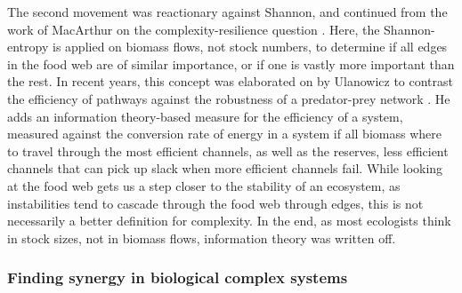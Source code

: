 \documentclass[../main.tex]{subfiles}
\begin{document}
The second movement was reactionary against Shannon, and continued from the work of MacArthur on the complexity-resilience question \cite{ulanowicz2009quantifying}.
Here, the Shannon-entropy is applied on biomass flows, not stock numbers, to determine if all edges in the food web are of similar importance, or if one is vastly more important than the rest.
In recent years, this concept was elaborated on by Ulanowicz to contrast the efficiency of pathways against the robustness of a predator-prey network \cite{ulanowicz2009quantifying}.
He adds an information theory-based measure for the efficiency of a system, measured against the conversion rate of energy in a system if all biomass where to travel through the most efficient channels, as well as the reserves, less efficient channels that can pick up slack when more efficient channels fail.
While looking at the food web gets us a step closer to the stability of an ecosystem, as instabilities tend to cascade through the food web through edges, this is not necessarily a better definition for complexity.
In the end, as most ecologists think in stock sizes, not in biomass flows, information theory was written off.

\subsubsection{Finding synergy in biological complex systems}
\end{document}
